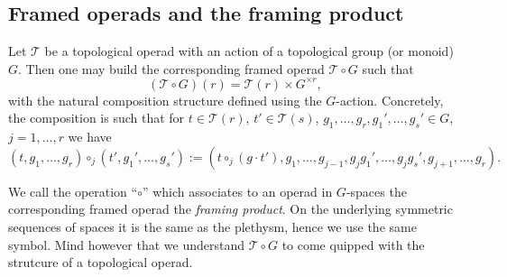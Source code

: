 \documentclass[a4paper]{amsart}
\theoremstyle{plain}
\newtheorem{prop}[thm]{Proposition}
\theoremstyle{definition}
\newcommand{\op}{\mathcal}
\newcommand{\dgca}{\mathsf{Dgca}}
\renewcommand{\mod}{\mathrm{mod}}
\renewcommand{\Top}{\mathsf{Top}}
\begin{document}
% 
% 
% 
% 
% 


\subsection{Framed operads and the framing product}\label{sec:framed operads}
Let $\op T$ be a topological operad with an action of a topological group (or monoid) $G$. Then one may build the corresponding framed operad $\op T\circ G$ such that 
\[
(\op T\circ G)(r) = \op T(r) \times G^{\times r},
\]
with the natural composition structure defined using the $G$-action. Concretely, the composition is such that for $t\in \op T(r)$, $t'\in \op T(s)$, $g_1,\dots,g_r,g_1',\dots,g_s'\in G$, $j=1,\dots,r$ we have
\[
 (t,g_1,\dots, g_r) \circ_j (t',g_1',\dots, g_s')
:=
(t\circ_j (g\cdot t'), g_1,\dots,g_{j-1}, g_jg_1',\dots, g_j g_s', g_{j+1},\dots, g_r).
\]

We call the operation ``$\circ$'' which associates to an operad in $G$-spaces the corresponding framed operad the \emph{framing product}.
On the underlying symmetric sequences of spaces it is the same as the plethysm, hence we use the same symbol. Mind however that we understand $\op T\circ G$ to come quipped with the strutcure of a topological operad.
\end{document}
